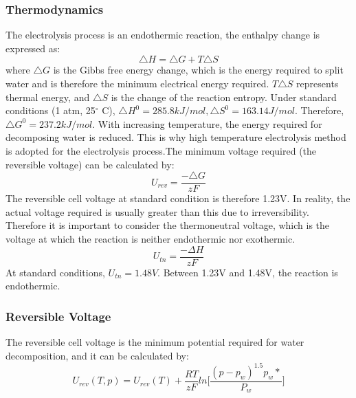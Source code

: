 \subsubsection{Thermodynamics} 
The electrolysis process is an endothermic reaction, the enthalpy change is expressed as:\cite{gibbs}
\begin{equation} 
\triangle H =\triangle G + T\triangle S 
\end{equation}
where $\triangle G $ is the Gibbs free energy change, which is the energy required to split water and is therefore the minimum electrical energy required. $T\triangle S$ represents thermal energy, and $\triangle S$ is the change of the reaction entropy.  
Under standard conditions (1 atm, 25$^{\circ}$ C), $\triangle H^0 = 285.8 kJ/mol, \triangle S^0 = 163.14 J/mol$. Therefore, $\triangle G^0 = 237.2 kJ/mol.$\cite{gibbs} With increasing temperature, the energy required for decomposing water is reduced. This is why high temperature electrolysis method is adopted for the electrolysis process.The minimum voltage required (the reversible voltage) can be calculated by:\cite{gibbs}
\begin{equation} 
U_{rev} =\frac {-\triangle G} {zF} 
\end{equation} 
The reversible cell voltage at standard condition is therefore 1.23V. In reality, the actual voltage required is usually greater than this due to irreversibility. Therefore it is important to consider the thermoneutral voltage, which is the voltage at which the reaction is neither endothermic nor exothermic. 
\begin{equation} 
U_{tn}=\frac{-\Delta H} {zF}
\end{equation} 
At standard conditions, $U_{tn} = 1.48V.$ Between 1.23V and 1.48V, the reaction is endothermic.

\subsubsection{Reversible Voltage} 
The reversible cell voltage is the minimum potential required for water decomposition, and it can be calculated by:\cite{reversible}
\begin{equation} 
U_{rev}(T,p)=U_{rev}(T) + \frac{RT} {zF}ln\bigg[\frac{(p-p_w)^{1.5}p_w*} {P_w}\bigg]
\end{equation} 

